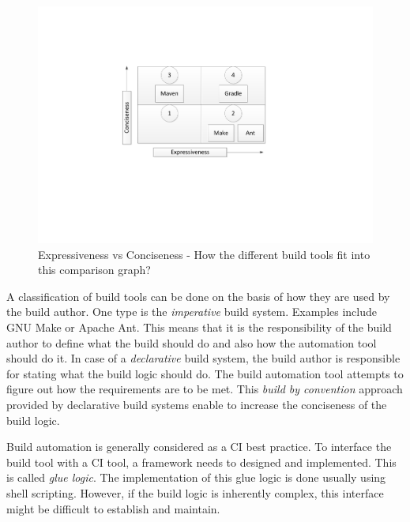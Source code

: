 \documentclass[12pt, a4paper, titlepage]{scrartcl}
\begin{document}
\begin{figure}[!ht]
\centering
	\includegraphics[scale=0.9, clip, trim=6cm 7cm 0cm 4cm]{ExpVsConc.pdf}
\caption{Expressiveness vs Conciseness - How the different build tools fit into this comparison graph?}
\label{fig:expr-vs-conc}
\end{figure}
\par A classification of build tools can be done on the basis of how they are used by the build author. One type is the \emph{imperative} build system. Examples include GNU Make or Apache Ant. This means that it is the responsibility of the build author to define what the build should do and also how the automation tool should do it. In case of a \emph{declarative} build system, the build author is responsible for stating what the build logic should do. The build automation tool attempts to figure out how the requirements are to be met. This \emph{build by convention} approach provided by declarative build systems enable to increase the conciseness of the build logic. 
\par Build automation is generally considered as a CI best practice\cite{fowler2006continuous}. To interface the build tool with a CI tool, a framework needs to designed and implemented. This is called \emph{glue logic}. The implementation of this glue logic is done usually using shell scripting. However, if the build logic is inherently complex, this interface might be difficult to establish and maintain. 
\end{document}
